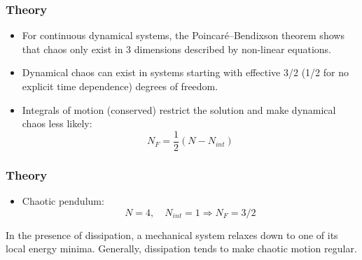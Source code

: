 \documentclass{beamer}
\begin{document}

\begin{frame}

\frametitle{Theory}
\begin{itemize}
\item
For continuous dynamical systems, the Poincaré–Bendixson theorem shows that chaos only exist in 3 dimensions described by non-linear equations.
\item
Dynamical chaos can exist in systems starting with effective 3/2 (1/2 for no explicit time dependence) degrees of freedom.
\item
Integrals of motion (conserved) restrict the solution and make dynamical chaos less likely:
\[ N_F = \dfrac{1}{2} (N - N_{int}) \]
\end{itemize}

\end{frame}


\begin{frame}

\frametitle{Theory}

\begin{itemize}
\item Chaotic pendulum:
\[ N = 4, \quad N_{int} = 1 \Rightarrow N_F = 3/2 \]
\end{itemize}

In the presence of dissipation, a mechanical system relaxes down to one of its local energy minima.
Generally, dissipation tends to make chaotic motion regular.

\end{frame}

\end{document}
